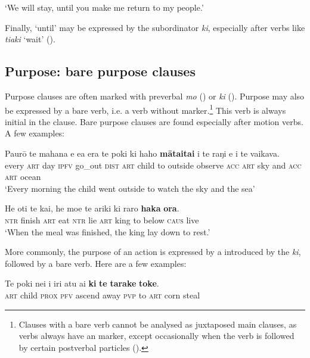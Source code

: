 \glt 
‘We will stay, until you make me return to my people.’ \textstyleExampleref{[Fel-1978.115]}
\z

Finally, ‘until’ may be expressed by the subordinator \textit{ki}, especially after verbs like \textit{tiaki} ‘wait’ ().

\subsection{Purpose: bare purpose clauses}\label{sec:11.6.3}
Purpose clauses are often marked with preverbal \textit{mo} () or \textit{ki} (). Purpose may also be expressed by a bare verb, i.e. a verb without  marker.\footnote{\label{fn:532}Clauses with a bare verb cannot be analysed as juxtaposed main clauses, as  verbs always have an  marker, except occasionally when the verb is followed by certain postverbal particles ().} This verb is always initial in the clause. Bare purpose clauses are found especially after motion verbs. A few examples:

\ea\label{ex:11.244}
\gll Paurō te mahana e e{\ꞌ}a era te poki ki haho \textbf{māta{\ꞌ}ita{\ꞌ}i} i te raŋi  {\ꞌ}e i te vaikava.\\
every \textsc{art} day \textsc{ipfv} go\_out \textsc{dist} \textsc{art} child to outside observe \textsc{acc} \textsc{art} sky  and \textsc{acc} \textsc{art} ocean\\

\glt 
‘Every morning the child went outside to watch the sky and the sea’ \textstyleExampleref{[R532-07.004]}
\z

\ea\label{ex:11.245}
\gll He oti te kai, he moe te {\ꞌ}ariki ki raro \textbf{haka} \textbf{ora}. \\
\textsc{ntr} finish \textsc{art} eat \textsc{ntr} lie \textsc{art} king to below \textsc{caus} live \\

\glt
‘When the meal was finished, the king lay down to rest.’ \textstyleExampleref{[Ley-2-10.017]}
\z

More commonly, the purpose of an action is expressed by a  introduced by the  \textit{ki}, followed by a bare verb. Here are a few examples:

\ea\label{ex:11.246}
\gll Te poki nei i iri atu ai \textbf{ki} \textbf{te} \textbf{tarake} \textbf{toke}. \\
\textsc{art} child \textsc{prox} \textsc{pfv} ascend away \textsc{pvp} to \textsc{art} corn steal \\

